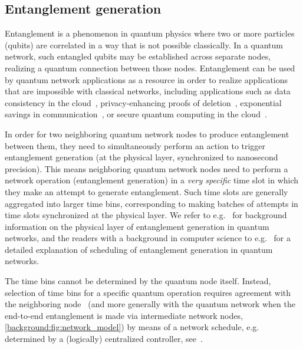 \subsection{Entanglement generation}
\label{background:sec:entanglement}
Entanglement is a phenomenon in quantum physics where two or more particles (qubits) are correlated in a way that is not possible classically. In a quantum network, such entangled qubits may be established across separate nodes, realizing a quantum connection between those nodes. Entanglement can be used by quantum network applications as a resource in order to realize applications~\cite{wehner_2018_stages} that are impossible with classical networks, including applications such as data consistency in the cloud~\cite{benor_2005_byzantine}, privacy-enhancing proofs of deletion~\cite{poremba_quantum_2022}, exponential savings in communication~\cite{guerin_exponential_2016}, or secure quantum computing in the cloud~\cite{broadbent_2009_ubqc,childs_2005_secure_qc}.

In order for two neighboring quantum network nodes to produce entanglement between them, they need to simultaneously perform an action to trigger entanglement generation (at the physical layer, synchronized to nanosecond precision).
This means neighboring quantum network nodes need to perform a network operation (entanglement generation) in a \emph{very specific} time slot in which they make an attempt to generate entanglement.
Such time slots are generally aggregated into larger time bins, corresponding to making batches of attempts in time slots synchronized at the physical layer.
We refer to e.g.~\cite{pompili_2022_experimental} for background information on the physical layer of entanglement generation in quantum networks, and the readers with a background in computer science to e.g.~\cite{dahlberg_2019_egp} for a detailed explanation of scheduling of entanglement generation in quantum networks.

The time bins cannot be determined by the quantum node itself.
Instead, selection of time bins for a specific quantum operation requires agreement with the neighboring node~\cite{dahlberg_2019_egp} (and more generally with the quantum network when the end-to-end entanglement is made via intermediate network nodes, \cref{background:fig:network_model}) by means of a network schedule, e.g. determined by a (logically) centralized controller, see~\cite{skrzypczyk_2021_arch}.


